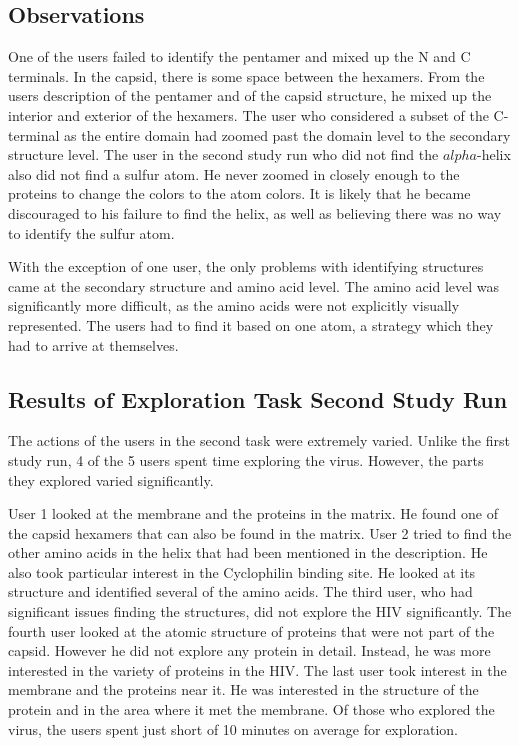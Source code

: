 \documentclass[review,journal]{vgtc}         %
\begin{document}
	\subsection{Observations}
	One of the users failed to identify the pentamer and mixed up the N and C terminals. 
	In the capsid, there is some space between the hexamers. 
	From the users description of the pentamer and of the capsid structure, he mixed up the interior and exterior of the hexamers. 
	The user who considered a subset of the C-terminal as the entire domain had zoomed past the domain level to the secondary structure level.
	The user in the second study run who did not find the $alpha$-helix also did not find a sulfur atom. He never zoomed in closely enough to the proteins to change the colors to the atom colors. It is likely that he became discouraged to his failure to find the helix, as well as believing there was no way to identify the sulfur atom.
	
	With the exception of one user, the only problems with identifying structures came at the secondary structure and amino acid level. 
	The amino acid level was significantly more difficult, as the amino acids were not explicitly visually represented. 
	The users had to find it based on one atom, a strategy which they had to arrive at themselves. 
	
	
	
	\subsection{Results of Exploration Task Second Study Run}
	
	The actions of the users in the second task were extremely varied. 
	Unlike the first study run, 4 of the 5 users spent time exploring the virus. 
	However, the parts they explored varied significantly. 
	
	User 1 looked at the membrane and the proteins in the matrix. 
	He found one of the capsid hexamers that can also be found in the matrix.
	User 2 tried to find the other amino acids in the helix that had been mentioned in the description. 
	He also took particular interest in the Cyclophilin binding site. 
	He looked at its structure and identified several of the amino acids.
	The third user, who had significant issues finding the structures, did not explore the HIV significantly.
	The fourth user looked at the atomic structure of proteins that were not part of the capsid.
	However he did not explore any protein in detail. 
	Instead, he was more interested in the variety of proteins in the HIV.
	The last user took interest in the membrane and the proteins near it.
	He was interested in the structure of the protein and in the area where it met the membrane.
	Of those who explored the virus, the users spent just short of 10 minutes on average for exploration.
	
\end{document}
